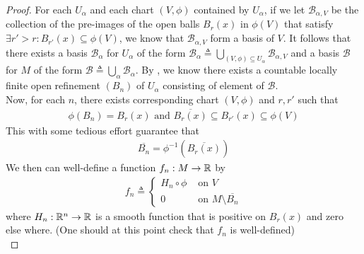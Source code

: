 \documentclass{report}
\begin{document}
\begin{proof}
For each $U_\alpha $ and each chart $(V,\phi)$ contained by $U_\alpha $, if we let $\mathcal{B}_{\alpha ,V}$ be the collection of the pre-images of the open balls $B_r(x)$ in $\phi (V)$ that satisfy $\exists r'>r:B_{r'}(x)\subseteq \phi (V)$, we know that $\mathcal{B}_{\alpha ,V}$ form a basis of $V$. It follows that there exists a basis $\mathcal{B}_\alpha $ for $U_\alpha $ of the form $\mathcal{B}_\alpha \triangleq \bigcup_{(V,\phi)\subseteq U_\alpha }\mathcal{B}_{\alpha ,V}$ and a basis $\mathcal{B}$ for $M$ of the form  $\mathcal{B}\triangleq \bigcup_{\alpha}\mathcal{B}_\alpha $. By , we know there exists a countable locally finite open refinement $(B_n)$ of $U_\alpha $ consisting of element of $\mathcal{B}$.\\

Now, for each $n$, there exists corresponding chart $(V,\phi)$ and $r,r'$ such that  
 \begin{align*}
   \phi (B_n)=B_r(x)\text{ and }\overline{B_r(x)}\subseteq B_{r'}(x)\subseteq \phi (V)
\end{align*}
This with some tedious effort guarantee that  
\begin{align*}
\overline{B_n}=\phi^{-1}(\overline{B_r(x)})
\end{align*}
We then can well-define a function $f_n:M\rightarrow \mathbb{R}$ by 
\begin{align*}
f_n \triangleq \begin{cases}
  H_n \circ \phi &\text{ on }V\\
  0&\text{ on }M\setminus \overline{B_n}
\end{cases}
\end{align*}
where $H_n:\mathbb{R}^n\rightarrow \mathbb{R}$ is a smooth function that is positive on $B_r(x)$ and zero else where. (One should at this point check that $f_n$ is well-defined)\\


\end{proof}
\end{document}
